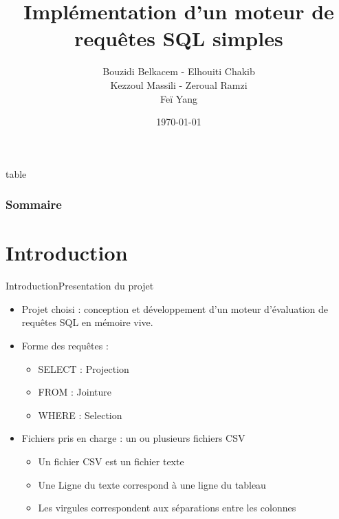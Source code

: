 \documentclass[10pt,handout]{beamer}
\title[Moteur de requêtes SQL]{Implémentation d’un moteur de \\ requêtes SQL simples}
\author[Bouzidi, Elhouiti, Kezzoul, Zeroual, Feï]{Bouzidi Belkacem - Elhouiti Chakib \\ Kezzoul Massili - Zeroual Ramzi \\ Feï Yang}
\institute[]{Université de Montpellier}
\date{\today}
\newif\ifplacelogo %
\begin{document}
\placelogofalse
\begin{frame}
	\titlepage
\end{frame}

\placelogotrue


\begin{frame}{table}
	\frametitle{Sommaire}
	\tableofcontents
\end{frame}

\section{Introduction}
\begin{frame}{Introduction}{Presentation du projet}
\begin{itemize}
  \item Projet choisi : conception et développement d’un moteur d’évaluation de requêtes SQL en mémoire vive.
  \item Forme des requêtes :
  \begin{itemize}
    \item SELECT : Projection
    \item FROM : Jointure
    \item WHERE : Selection
  \end{itemize}
  \item Fichiers pris en charge : un ou plusieurs fichiers CSV
  \begin{itemize}
    \item Un fichier CSV est un fichier texte
    \item Une Ligne du texte correspond à une ligne du tableau
    \item Les virgules correspondent aux séparations entre les colonnes
  \end{itemize}
\end{itemize}
\end{frame}
\end{document}
